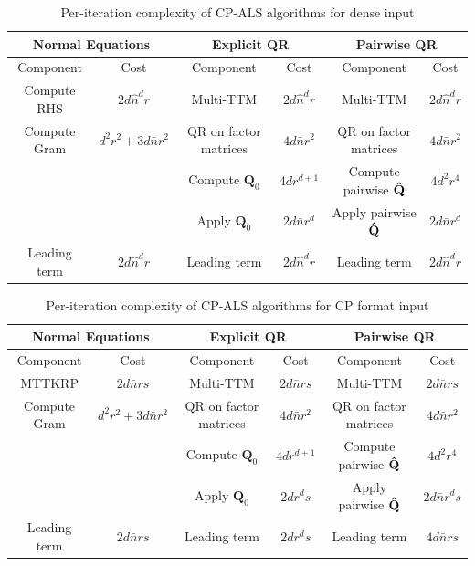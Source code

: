 \documentclass{article}
\newcommand{\mat}[1]{\mathbf{#1}}
\newcommand{\M}[2][]{\bm{#1{\mathbf{\MakeUppercase{#2}}}}} 		%
\begin{document}
\begin{table}[!ht] 
  \centering
  \begin{tabular}{|c|c|c|c|c|c|}
    \hline
    \multicolumn{2}{|c|}{\textbf{Normal Equations}} & \multicolumn{2}{c|}{\textbf{Explicit QR}} & \multicolumn{2}{c|}{\textbf{Pairwise QR}} \\
    \hline
    Component & Cost & Component & Cost & Component & Cost \\
    \hline
    Compute RHS &$2d \hat{n}^d r$ &Multi-TTM &$2d\hat n^d r$  & Multi-TTM &$2d\hat n^d r$  \\
    Compute Gram & $d^2r^2 + 3d \bar{n} r^2$&QR on factor matrices & $4d \bar n r^2$ & QR on factor matrices & $4d \bar n r^2$\\
     & &Compute $\mat{Q}_0$ & $4dr^{d+1}$& Compute pairwise $\M[\hat]{Q}$ & $4d^2r^4$\\
     & &Apply $\mat{Q}_0$& $2d\bar n r^d$& Apply pairwise $\M[\hat]{Q}$ & $2d\bar n r^d$\\
    \hline
    Leading term & $2d \hat{n}^d r$ & Leading term & $2d \hat{n}^d r$ & Leading term & $2d \hat{n}^d r$ \\
    \hline
  \end{tabular}
  \caption{Per-iteration complexity of CP-ALS algorithms for dense input}
  \label{tab:dense_its_part}
\end{table}

\begin{table}[!ht] 
  \centering
  \begin{tabular}{|c|c|c|c|c|c|}
    \hline
    \multicolumn{2}{|c|}{\textbf{Normal Equations}} & \multicolumn{2}{c|}{\textbf{Explicit QR}} & \multicolumn{2}{c|}{\textbf{Pairwise QR}} \\
    \hline
    Component & Cost & Component & Cost & Component & Cost \\
    \hline
    MTTKRP & $2d\bar n rs$ &  Multi-TTM &$2d\bar n rs$  & Multi-TTM &$2d\bar n rs$  \\
    Compute Gram & $d^2r^2+3d\bar n r^2$&QR on factor matrices & $4d \bar n r^2$ & QR on factor matrices & $4d \bar n r^2$\\
    & &Compute $\mat{Q}_0$ & $4dr^{d+1}$& Compute pairwise $\M[\hat]{Q}$ & $4d^2r^4$\\
     & &Apply $\mat{Q}_0$& $2dr^ds$& Apply pairwise $\M[\hat]{Q}$ & $2d \bar n r^ds$\\
    \hline
     Leading term & $2d\bar n rs$ & Leading term & $2dr^ds$ & Leading term & $4d\bar n rs$ \\
    \hline
  \end{tabular}
  \caption{Per-iteration complexity of CP-ALS algorithms for CP format input}
  \label{tab:kruskal_its_part}
\end{table}
\end{document}
